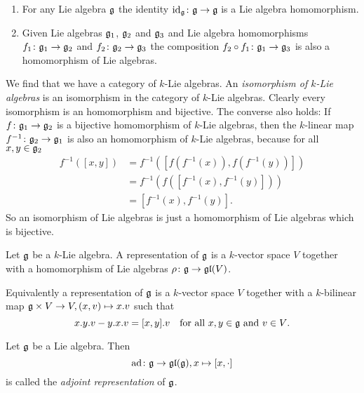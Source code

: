 \begin{expls}
 \begin{enumerate}
  \item
   For any Lie algebra $\mathfrak{g}$ the identity $\operatorname{id}_{\mathfrak{g}} \colon \mathfrak{g} \to \mathfrak{g}$ is a Lie algebra homomorphism.
  \item
   Given Lie algebras $\mathfrak{g}_1$, $\mathfrak{g}_2$ and $\mathfrak{g}_3$ and Lie algebra homomorphisms $f_1 \colon \mathfrak{g}_1 \to \mathfrak{g}_2$ and $f_2 \colon \mathfrak{g}_2 \to \mathfrak{g}_3$ the composition $f_2 \circ f_1 \colon \mathfrak{g}_1 \to \mathfrak{g}_3$ is also a homomorphism of Lie algebras.
 \end{enumerate}
\end{expls}


\begin{rem}
 We find that we have a category of $k$-Lie algebras. An \emph{isomorphism of $k$-Lie algebras} is an isomorphism in the category of $k$-Lie algebras. Clearly every isomorphism is an homomorphism and bijective. The converse also holds: If $f \colon \mathfrak{g}_1 \to \mathfrak{g}_2$ is a bijective homomorphism of $k$-Lie algebras, then the $k$-linear map $f^{-1} \colon \mathfrak{g}_2 \to \mathfrak{g}_1$ is also an homomorphism of $k$-Lie algebras, because for all $x,y \in \mathfrak{g}_2$
 \begin{align*}
  f^{-1}( [x,y] )
  &= f^{-1}( [ f(f^{-1}(x)), f(f^{-1}(y)) ] ) \\
  &= f^{-1}(f( [f^{-1}(x) , f^{-1}(y)] )) \\
  &= [f^{-1}(x), f^{-1}(y)].
 \end{align*}
 So an isomorphism of Lie algebras is just a homomorphism of Lie algebras which is bijective.
\end{rem}


\begin{defi}
 Let $\mathfrak{g}$ be a $k$-Lie algebra. A representation of $\mathfrak{g}$ is a $k$-vector space $V$ together with a homomorphism of Lie algebras $\rho \colon \mathfrak{g} \to \mathfrak{gl}(V)$.
\end{defi}


\begin{rem}
  Equivalently a representation of $\mathfrak{g}$ is a $k$-vector space $V$ together with a $k$-bilinear map $\mathfrak{g} \times V \to V, (x,v) \mapsto x.v$ such that
 \[
  x.y.v - y.x.v = [x,y].v \quad \text{for all $x,y \in \mathfrak{g}$ and $v \in V$}.
 \]
\end{rem}


\begin{defi}
 Let $\mathfrak{g}$ be a Lie algebra. Then
 \[
  \operatorname{ad} \colon \mathfrak{g} \to \mathfrak{gl}(\mathfrak{g}), x \mapsto [x,\cdot]
 \]
 is called the \emph{adjoint representation} of $\mathfrak{g}$.
\end{defi}


